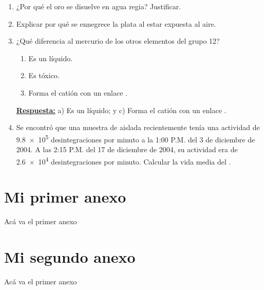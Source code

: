 \documentclass[10pt,a4paper]{book}
\newcommand{\rta}{\underline{\textbf{Respuesta:}} }
\begin{document}
\begin{enumerate}
	\item  ¿Por qué el oro se disuelve en agua regia? Justificar.
	
	\item Explicar por qué se ennegrece la plata al estar expuesta al aire.
	
	\item ¿Qué diferencia al mercurio de los otros elementos del grupo 12?
	\begin{enumerate}
		\item Es un líquido.
		\item Es tóxico.
		\item Forma el catión  con un enlace .
	\end{enumerate}
	
	\rta a) Es un líquido; y c) Forma el catión  con un enlace .
	
	\item  Se encontró que una muestra de  aislada recientemente tenía una actividad de \num{9,8e5}
	desintegraciones por minuto a la 1:00 P.M. del 3 de diciembre de 2004. A las 2:15 P.M. del
	17 de diciembre de 2004, su actividad era de \num{2,6e4} desintegraciones por minuto. Calcular la
	vida media del .
	
	
	
\end{enumerate}

\appendix
\begin{appendices}
\printnomenclature
	
\chapter{Mi primer anexo}
Ac\'a va el primer anexo

\chapter{Mi segundo anexo}
Ac\'a va el primer anexo
\end{appendices}
\end{document}
